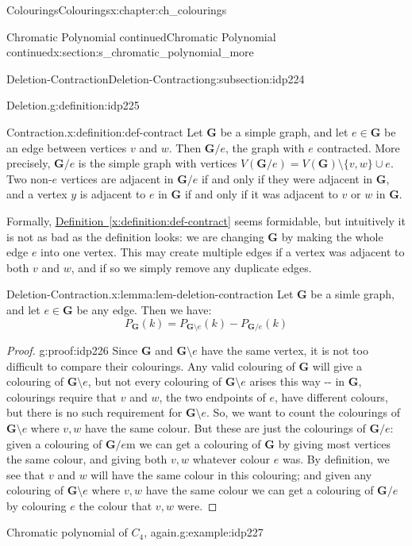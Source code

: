 \documentclass[oneside,10pt,]{book}
\newcommand{\xreffont}{\relax}
\numberwithin{equation}{section}
\newcommand{\bfG}{\mathbf{G}}
\begin{document}
\begin{chapterptx}{Colourings}{}{Colourings}{}{}{x:chapter:ch_colourings}
\begin{sectionptx}{Chromatic Polynomial continued}{}{Chromatic Polynomial continued}{}{}{x:section:s_chromatic_polynomial_more}
\begin{subsectionptx}{Deletion-Contraction}{}{Deletion-Contraction}{}{}{g:subsection:idp224}
\begin{definition}{Deletion.}{g:definition:idp225}
\end{definition}
\begin{definition}{Contraction.}{x:definition:def-contract}%
Let \(\bfG\) be a simple graph, and let \(e\in \bfG\) be an edge between vertices \(v\) and \(w\).  Then \(\bfG/e\), the graph with \(e\) contracted.  More precisely, \(\bfG/e\) is the simple graph with vertices \(V(\bfG/e)=V(\bfG)\setminus \{v,w\}\cup {e}\).  Two non-\(e\) vertices are adjacent in \(\bfG/e\) if and only if they were adjacent in \(\bfG\), and a vertex \(y\) is adjacent to \(e\) in \(\bfG\) if and only if it was adjacent to \(v\) or \(w\) in \(\bfG\).%
\end{definition}
Formally, \hyperref[x:definition:def-contract]{Definition~{\xreffont\ref{x:definition:def-contract}}} seems formidable, but intuitively it is not as bad as the definition looks: we are changing \(\bfG\) by making the whole edge \(e\) into one vertex.  This may create multiple edges if a vertex was adjacent to both \(v\) and \(w\), and if so we simply remove any duplicate edges.%
\begin{lemma}{Deletion-Contraction.}{}{x:lemma:lem-deletion-contraction}%
Let \(\bfG\) be a simle graph, and let \(e\in \bfG\) be any edge.  Then we have:%
%
\begin{equation*}
P_\bfG(k)=P_{\bfG\setminus e}(k)-P_{\bfG/e}(k)
\end{equation*}
\end{lemma}
\begin{proof}{}{g:proof:idp226}
Since \(\bfG\) and \(\bfG\setminus e\) have the same vertex, it is not too difficult to compare their colourings.  Any valid colouring of \(\bfG\) will give a colouring of \(\bfG\setminus e\), but not every colouring of \(\bfG\setminus e\) arises this way -{}-{} in \(\bfG\), colourings require that \(v\) and \(w\), the two endpoints of \(e\), have different colours, but there is no such requirement for \(\bfG\setminus e\).  So, we want to count the colourings of \(\bfG\setminus e\) where \(v,w\) have the same colour.  But these are just the colourings of \(\bfG/e\): given a colouring of \(\bfG/e\)m we can get a colouring of \(\bfG\) by giving most vertices the same colour, and giving both \(v,w\) whatever colour \(e\) was.  By definition, we see that \(v\) and \(w\) will have the same colour in this colouring; and given any colouring of \(\bfG\setminus e\) where \(v,w\) have the same colour we can get a colouring of \(\bfG/e\) by colouring \(e\) the colour that \(v,w\) were.%
\end{proof}
\begin{example}{Chromatic polynomial of \(C_4\), again.}{g:example:idp227}%

\end{example}
\end{subsectionptx}
\end{sectionptx}
\end{chapterptx}
\end{document}
